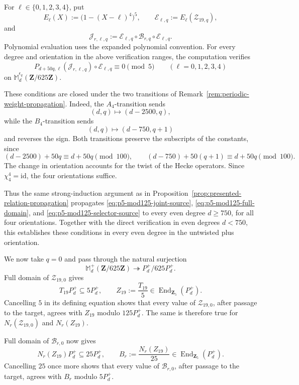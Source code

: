 \documentclass[11pt]{article}
\newcommand{\End}{\operatorname{End}}
\theoremstyle{plain}
\theoremstyle{definition}
\theoremstyle{remark}
\numberwithin{equation}{section}
\begin{document}
For \(\ell\in\{0,1,2,3,4\}\), put \[ E_\ell(X):=\bigl(1-(X-\ell)^4\bigr)^5, \qquad \mathcal E_{\ell,q}:=E_\ell(\mathcal Z_{19,q}), \] and \[ \mathcal J_{r,\ell,q}:= \mathcal E_{\ell,q}\circ \mathcal B_{r,q}\circ \mathcal E_{\ell,q}. \] Polynomial evaluation uses the expanded polynomial convention. For every degree and orientation in the above verification ranges, the computation verifies \begin{equation} P_{d+50q,\ell}(\mathcal J_{r,\ell,q}) \circ\mathcal E_{\ell,q} \equiv0\pmod5 \qquad(\ell=0,1,2,3,4) \label{eq:p5-mod125-selector-source} \end{equation} on \(\mathbb M_d^{\epsilon_q}(\mathbf Z/625\mathbf Z)\). 

These conditions are closed under the two transitions of Remark~\ref{rem:periodic-weight-propagation}. Indeed, the \(A_4\)-transition sends \[ (d,q)\longmapsto(d-2500,q), \] while the \(B_4\)-transition sends \[ (d,q)\longmapsto(d-750,q+1) \] and reverses the sign. Both transitions preserve the subscripts of the constants, since \[ (d-2500)+50q\equiv d+50q\pmod{100}, \qquad (d-750)+50(q+1)\equiv d+50q\pmod{100}. \] The change in orientation accounts for the twist of the Hecke operators. Since \(\chi_4^4=\mathrm{id}\), the four orientations suffice.

Thus the same strong-induction argument as in Proposition~\ref{prop:presented-relation-propagation} propagates \eqref{eq:p5-mod125-joint-source}, \eqref{eq:p5-mod125-full-domain}, and \eqref{eq:p5-mod125-selector-source} to every even degree \(d\geq750\), for all four orientations. Together with the direct verification in even degrees \(d<750\), this establishes these conditions in every even degree in the untwisted plus orientation.

We now take \(q=0\) and pass through the natural surjection \[ \mathbb M_d^+(\mathbf Z/625\mathbf Z) \twoheadrightarrow P_d^+/625P_d^+. \]
Full domain of \(\mathcal Z_{19,0}\) gives \[ T_{19}P_d^+\subseteq5P_d^+, \qquad Z_{19}:=\frac{T_{19}}5 \in\End_{\mathbf Z_5}(P_d^+). \] Cancelling \(5\) in its defining equation shows that every value of \(\mathcal Z_{19,0}\), after passage to the target, agrees with \(Z_{19}\) modulo \(125P_d^+\). The same is therefore true for \(N_r(\mathcal Z_{19,0})\) and \(N_r(Z_{19})\). 

Full domain of \(\mathcal B_{r,0}\) now gives \[ N_r(Z_{19})P_d^+\subseteq25P_d^+, \qquad B_r:=\frac{N_r(Z_{19})}{25} \in\End_{\mathbf Z_5}(P_d^+). \] Cancelling \(25\) once more shows that every value of \(\mathcal B_{r,0}\), after passage to the target, agrees with \(B_r\) modulo \(5P_d^+\). 
\end{document}
